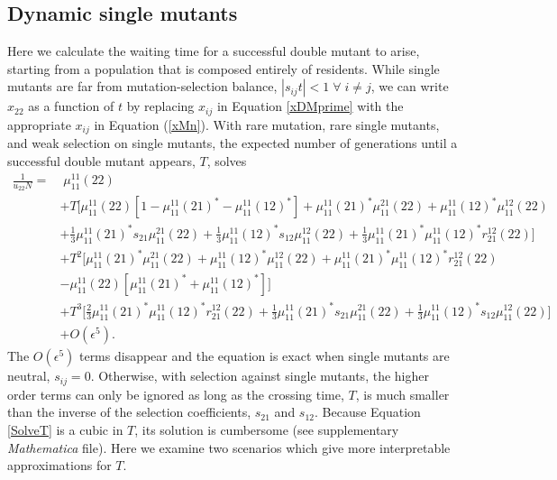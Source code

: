 \documentclass[review,3p,authoryear]{elsarticle}
\begin{document}
\begin{appendices}
\section{Dynamic single mutants}
\label{App:DM}
\renewcommand{\theequation}{A\arabic{equation}}
\setcounter{equation}{0} 


Here we calculate the waiting time for a successful double mutant to arise, starting from a population that is composed entirely of residents.  
While single mutants are far from mutation-selection balance, $| s_{ij} t | < 1 \; \forall \; i\neq j$, we can write $x_{22}$ as a function of $t$ by replacing $x_{ij}$ in Equation \eqref{xDMprime} with the appropriate $x_{ij}$ in Equation (\ref{xMn}).
With rare mutation, rare single mutants, and weak selection on single mutants, the expected number of generations until a successful double mutant appears, $T$, solves
\begin{align}\label{SolveT}
\frac{1}{u_{22} N}  = &\;  \mu_{11}^{11}(22) \nonumber\\
& + T \Big[  \mu_{11}^{11}(22) [1 - \mu_{11}^{11}(21)^* - \mu_{11}^{11}(12)^*] + \mu_{11}^{11}(21)^* \mu_{11}^{21}(22) + \mu_{11}^{11}(12)^* \mu_{11}^{12}(22) \nonumber\\
& + \frac{1}{3} \mu_{11}^{11}(21)^* s_{21} \mu_{11}^{21}(22) + \frac{1}{3} \mu_{11}^{11}(12)^* s_{12} \mu_{11}^{12}(22) + \frac{1}{3} \mu_{11}^{11}(21)^* \mu_{11}^{11}(12)^* r_{21}^{12}(22) \Big] \nonumber\\
& + T^2 \Big[ \mu_{11}^{11}(21)^* \mu_{11}^{21}(22) + \mu_{11}^{11}(12)^* \mu_{11}^{12}(22) + \mu_{11}^{11}(21)^* \mu_{11}^{11}(12)^* r_{21}^{12}(22) \nonumber\\
& - \mu_{11}^{11}(22) [\mu_{11}^{11}(21)^* + \mu_{11}^{11}(12)^*] \Big] \nonumber\\
& + T^3 \Big[ \frac{2}{3} \mu_{11}^{11}(21)^* \mu_{11}^{11}(12)^* r_{21}^{12}(22) + \frac{1}{3} \mu_{11}^{11}(21)^* s_{21} \mu_{11}^{21}(22) + \frac{1}{3} \mu_{11}^{11}(12)^* s_{12} \mu_{11}^{12}(22) \Big] \nonumber\\
& + O(\epsilon^5).
\end{align}
The $O(\epsilon^5)$ terms disappear and the equation is exact when single mutants are neutral, $s_{ij}=0$.  
Otherwise, with selection against single mutants, the higher order terms can only be ignored as long as the crossing time, $T$, is much smaller than the inverse of the selection coefficients, $s_{21}$ and $s_{12}$.
Because Equation \eqref{SolveT} is a cubic in $T$, its solution is cumbersome (see supplementary \textit{Mathematica} file).
Here we examine two scenarios which give more interpretable approximations for $T$.  


\end{appendices}
\end{document}
